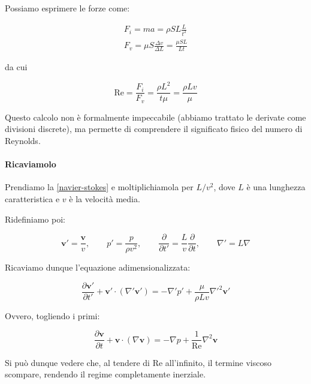 \documentclass[12pt,a4paper]{article}
\numberwithin{equation}{section}
\begin{document}
Possiamo esprimere le forze come:

\begin{subequations}
\begin{align}
F_i = m a = \rho S L \frac{L}{t^2}\\
F_v = \mu S \frac{\Delta v}{\Delta L} = \frac{\mu S L}{Lt}
\end{align}
\end{subequations}

da cui

\begin{equation}
\text{Re} = \frac{F_i}{F_v} =  \frac{\rho L^2}{t \mu} = \frac{\rho L v}{\mu}
\end{equation}

Questo calcolo non è formalmente impeccabile (abbiamo trattato le derivate come divisioni discrete), ma permette di comprendere il significato fisico del numero di Reynolds.

\paragraph{Ricaviamolo}

Prendiamo la \eqref{navier-stokes} e moltiplichiamola per $L/v^2$, dove $L$ è una lunghezza caratteristica e $v$ è la velocità media.

Ridefiniamo poi: 

\begin{equation}
\mathbf{v'} = \frac{\mathbf{v}}{v},\qquad p' = \frac{p}{\rho v^2},\qquad \frac{\partial}{\partial t'} = \frac{L}{v} \frac{\partial}{\partial t},\qquad \nabla' = L \nabla
\end{equation}

Ricaviamo dunque l'equazione adimensionalizzata: 

\begin{equation}
\frac{\partial \mathbf{v'}}{\partial t'} +\mathbf{v'} \cdot (\nabla' \mathbf{v'})  = -\nabla' p' + \frac{\mu}{\rho L v} \nabla'^2 \mathbf{v'}
\end{equation}

Ovvero, togliendo i primi:

\begin{equation}
\frac{\partial \mathbf{v}}{\partial t} +\mathbf{v} \cdot (\nabla \mathbf{v}) = -\nabla p + \frac{1}{\text{Re}} \nabla^2 \mathbf{v}
\end{equation}

Si può dunque vedere che, al tendere di Re all'infinito, il termine viscoso scompare, rendendo il regime completamente inerziale.
\end{document}
